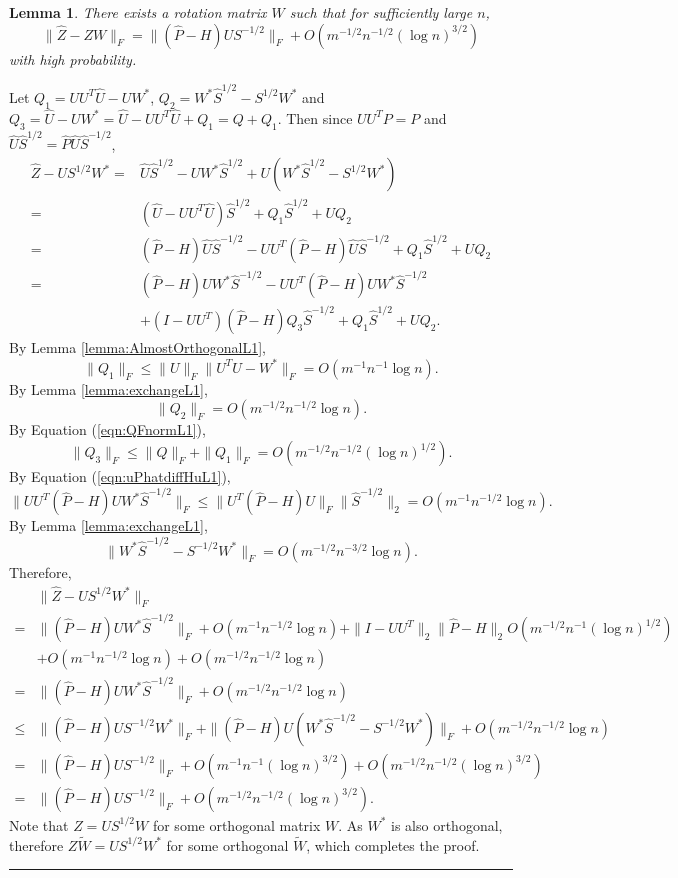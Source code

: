\documentclass[a4paper]{article}
\newenvironment{proof}{{\bf Proof:  }}{\hfill\rule{2mm}{2mm}}
\newtheorem{lemma}[fact]{Lemma}
\newcommand{\RT}[1]{\marginpar{\footnotesize\color{red}RT: #1}}
\begin{document}
\begin{lemma}
\label{lemma:XhatDiffXWexpressionL1}
There exists a rotation matrix $W$ such that for sufficiently large $n$,
\[
	\|\hat{Z} - Z W\|_F = \| (\hat{P} - H) U S^{-1/2} \|_F + O(m^{-1/2} n^{-1/2} (\log n)^{3/2})
\]
with high probability.
\end{lemma}
\begin{proof}
Let $Q_1 = U U^T \hat{U} - U W^*$, $Q_2 = W^* \hat{S}^{1/2} - S^{1/2} W^*$ and $Q_3 = \hat{U} - U W^* = \hat{U} - U U^T \hat{U} + Q_1 = Q + Q_1$. Then since $U U^T P = P$ and $\hat{U} \hat{S}^{1/2} = \hat{P} \hat{U} \hat{S}^{-1/2}$,
\begin{align*}
	\hat{Z} - U S^{1/2} W^*
    = & \hat{U} \hat{S}^{1/2} - U W^* \hat{S}^{1/2} + U(W^* \hat{S}^{1/2} - S^{1/2} W^*) \\
    = & (\hat{U} - U U^T \hat{U}) \hat{S}^{1/2} + Q_1 \hat{S}^{1/2} + U Q_2 \\
    = & (\hat{P} - H) \hat{U} \hat{S}^{-1/2} - U U^T(\hat{P} - H)\hat{U}\hat{S}^{-1/2} + Q_1 \hat{S}^{1/2} + U Q_2 \\
    = & (\hat{P} - H) U W^* \hat{S}^{-1/2} - U U^T(\hat{P} - H)U W^*\hat{S}^{-1/2} \\
    & + (I - U U^T)(\hat{P} - H) Q_3 \hat{S}^{-1/2} + Q_1 \hat{S}^{1/2} + U Q_2.
\end{align*}
By Lemma \ref{lemma:AlmostOrthogonalL1},
\[
	\|Q_1\|_F \le \| U\|_F \| U^T \hat{U} - W^* \|_F = O(m^{-1} n^{-1} \log n).
\]
By Lemma \ref{lemma:exchangeL1},
\[
	\|Q_2\|_F = O(m^{-1/2} n^{-1/2} \log n).
\]
By Equation (\ref{eqn:QFnormL1}),
\[
	\|Q_3\|_F \le \|Q\|_F + \|Q_1\|_F = O(m^{-1/2} n^{-1/2} (\log n)^{1/2}).
\]
By Equation (\ref{eqn:uPhatdiffHuL1}),
\[
	\| U U^T(\hat{P} - H)U W^*\hat{S}^{-1/2} \|_F
    \le \| U^T(\hat{P} - H)U \|_F \| \hat{S}^{-1/2} \|_2
    = O(m^{-1} n^{-1/2} \log n).
\]
By Lemma \ref{lemma:exchangeL1},
\[
	\| W^* \hat{S}^{-1/2} - S^{-1/2} W^* \|_F = O(m^{-1/2} n^{-3/2} \log n).
\]
Therefore,
\begin{align*}
	& \| \hat{Z} - U S^{1/2} W^* \|_F \\
    = & \| (\hat{P} - H) U W^* \hat{S}^{-1/2} \|_F + O(m^{-1} n^{-1/2} \log n)
    + \|I - U U^T \|_2 \| \hat{P} - H \|_2 O(m^{-1/2} n^{-1} (\log n)^{1/2}) \\
    & + O(m^{-1} n^{-1/2} \log n) + O(m^{-1/2} n^{-1/2} \log n)\\
    = & \| (\hat{P} - H) U W^* \hat{S}^{-1/2} \|_F + O(m^{-1/2} n^{-1/2} \log n) \\
    \le & \| (\hat{P} - H) U S^{-1/2} W^* \|_F + \|(\hat{P} - H) U (W^* \hat{S}^{-1/2} - S^{-1/2} W^*) \|_F + O(m^{-1/2} n^{-1/2} \log n) \\
    = & \| (\hat{P} - H) U S^{-1/2}\|_F + O(m^{-1} n^{-1} (\log n)^{3/2}) + O(m^{-1/2} n^{-1/2} (\log n)^{3/2}) \\
    = & \| (\hat{P} - H) U S^{-1/2}\|_F + O(m^{-1/2} n^{-1/2} (\log n)^{3/2}).
\end{align*}
\RT{$\|I - U U^T\|_2 = O(1)$}
Note that $Z = U S^{1/2} W$ for some orthogonal matrix $W$. As $W^*$ is also orthogonal, therefore $Z \tilde{W} = U S^{1/2} W^*$ for some orthogonal $\tilde{W}$, which completes the proof.
\end{proof}
\end{document}
